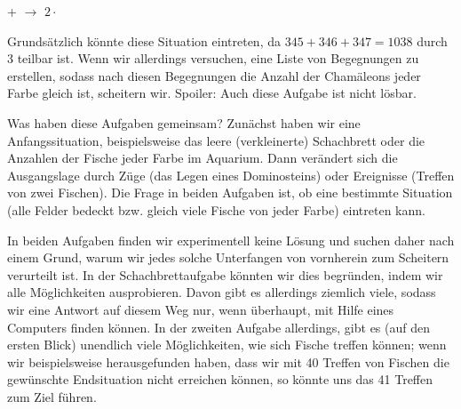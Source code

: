 \documentclass[a4paper,ngerman,12pt]{scrartcl}
\theoremstyle{definition}
\begin{document}
\begin{center}
   +  $\longrightarrow$ $2 \cdot$ 
\end{center}

Grundsätzlich könnte diese Situation eintreten, da $345 + 346 + 347 = 1038$ durch $3$ teilbar ist. Wenn wir allerdings versuchen, eine Liste von Begegnungen zu erstellen, sodass nach diesen Begegnungen die Anzahl der Chamäleons jeder Farbe gleich ist, scheitern wir. Spoiler: Auch diese Aufgabe ist nicht lösbar.

Was haben diese Aufgaben gemeinsam? Zunächst haben wir eine Anfangssituation, beispielsweise das leere (verkleinerte) Schachbrett oder die Anzahlen der Fische jeder Farbe im Aquarium. Dann verändert sich die Ausgangslage durch Züge (das Legen eines Dominosteins) oder Ereignisse (Treffen von zwei Fischen). Die Frage in beiden Aufgaben ist, ob eine bestimmte Situation (alle Felder bedeckt bzw. gleich viele Fische von jeder Farbe) eintreten kann.

In beiden Aufgaben finden wir experimentell keine Lösung und suchen daher nach einem Grund, warum wir jedes solche Unterfangen von vornherein zum Scheitern verurteilt ist. In der Schachbrettaufgabe könnten wir dies begründen, indem wir alle Möglichkeiten ausprobieren. Davon gibt es allerdings ziemlich viele, sodass wir eine Antwort auf diesem Weg nur, wenn überhaupt, mit Hilfe eines Computers finden können. In der zweiten Aufgabe allerdings, gibt es (auf den ersten Blick) unendlich viele Möglichkeiten, wie sich Fische treffen können; wenn wir beispielsweise herausgefunden haben, dass wir mit 40 Treffen von Fischen die gewünschte Endsituation nicht erreichen können, so könnte uns das 41 Treffen zum Ziel führen.
\end{document}
